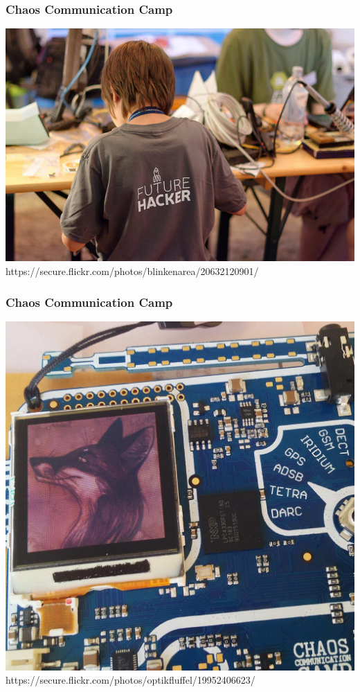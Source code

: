 \documentclass[12pt]{beamer}
\newcommand{\license}[2][]{\\#2\ifthenelse{\equal{#1}{}}{}{\\\scriptsize\url{#1}}}
\begin{document}
	\begin{frame}
		\frametitle{Chaos Communication Camp}
		\begin{minipage}{\linewidth}
			\centering
			\includegraphics[height=0.7\textheight]{img//camp2015-future-hacker.jpg}
			\tiny\license{https://secure.flickr.com/photos/blinkenarea/20632120901/}
		\end{minipage}
  	\end{frame}
	\begin{frame}
		\frametitle{Chaos Communication Camp}
		\begin{minipage}{\linewidth}
			\centering
			\includegraphics[height=0.7\textheight]{img//camp2015-badge.jpg}
			\tiny\license{https://secure.flickr.com/photos/optikfluffel/19952406623/}
		\end{minipage}
  	\end{frame}
\end{document}
